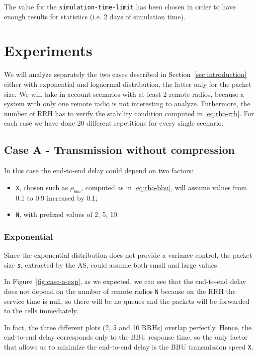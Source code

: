 \documentclass[11pt,a4paper,oneside, openright]{article}
\begin{document}
The value for the \texttt{simulation-time-limit} has been chosen in order to have enough results for statistics (i.e. 2 days of simulation time).

\section{Experiments}
We will analyze separately the two cases described in Section~\ref{sec:introduction} either with exponential and lognormal distribution, the latter only for the packet size.
We will take in account scenarios with at least 2 remote radios, because a system with only one remote radio is not interesting to analyze. Futhermore, the number of RRH has to verify the stability condition computed in \ref{eq:rho-rrh}. For each case we have done 20 different repetitions for every single scenario.

\subsection{Case A - Transmission without compression}
In this case the end-to-end delay could depend on two factors:
\begin{itemize}
	\item \texttt{X}, chosen such as $ \rho_{bbu} $, computed as in \ref{eq:rho-bbu}, will assume values from 0.1 to 0.9 increased by 0.1;
	\item \texttt{N}, with prefixed values of 2, 5, 10.
\end{itemize}
\subsubsection{Exponential}
Since the exponential distribution does not provide a variance control, the packet size \texttt{s}, extracted by the AS, could assume both small and large values.

In Figure~\ref{fig:case-a-exp}, as we expected, we can see that the end-to-end delay does not depend on the number of remote radios \texttt{N} because on the RRH the service time is null, so there will be no queues and the packets will be forwarded to the cells immediately.

In fact, the three different plots (2, 5 and 10 RRHs) overlap perfectly.
Hence, the end-to-end delay corresponds only to the BBU response time, so the only factor that allows us to minimize the end-to-end delay is the BBU transmission speed \texttt{X}.


\end{document}
